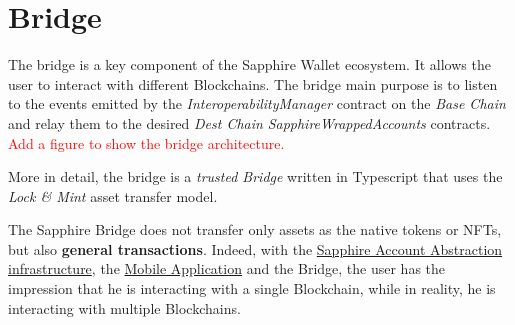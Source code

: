 \section{Bridge}
\label{sec:bridge}

The bridge is a key component of the Sapphire Wallet ecosystem. It allows the user to interact with different Blockchains. The bridge main purpose is to listen to the events emitted by the \textit{InteroperabilityManager} contract on the \textit{Base Chain} and relay them to the desired \textit{Dest Chain} \textit{SapphireWrappedAccounts} contracts. 
\textcolor{red}{Add a figure to show the bridge architecture.}

More in detail, the bridge is a \textit{trusted Bridge} written in Typescript that uses the \textit{Lock \& Mint} asset transfer model. 

The Sapphire Bridge does not transfer only assets as the native tokens or NFTs, but also \textbf{general transactions}. Indeed, with the \hyperref[sec:blockchain]{Sapphire Account Abstraction infrastructure}, the \hyperref[sec:mobile_application]{Mobile Application} and the Bridge, the user has the impression that he is interacting with a single Blockchain, while in reality, he is interacting with multiple Blockchains. 